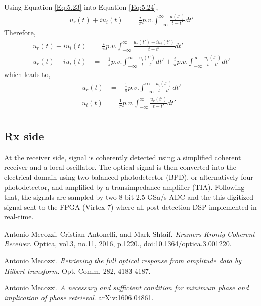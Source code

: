 Using Equation \ref{Eq:5.23} into Equation \ref{Eq:5.24},
\begin{equation}
\begin{split}
u_r(t)+iu_i(t) &=\frac{i}{\pi} p.v. \int_{-\infty}^{\infty} \frac{u(t')}{t-t'} dt' 
\end{split}
\label{Eq:5.24}
\end{equation}
Therefore,
\begin{equation}
\begin{split}
u_r(t)+iu_i(t) &=\frac{i}{\pi} p.v. \int_{-\infty}^{\infty} \frac{u_r(t')+iu_i(t')}{t-t'} dt' \\
u_r(t)+iu_i(t)&=-\frac{1}{\pi} p.v. \int_{-\infty}^{\infty} \frac{u_i(t')}{t-t'} dt' + \frac{i}{\pi} p.v. \int_{-\infty}^{\infty} \frac{u_r(t')}{t-t'} dt'
\end{split}
\label{Eq:5.24}
\end{equation}
which leads to,
\begin{equation}
\begin{split}
u_r(t) &=-\frac{1}{\pi} p.v. \int_{-\infty}^{\infty} \frac{u_i(t')}{t-t'} dt' \\
u_i(t) &=\frac{1}{\pi} p.v. \int_{-\infty}^{\infty} \frac{u_r(t')}{t-t'} dt' \\
\end{split}
\label{Eq:5.24}
\end{equation}





  



\subsection{Rx side}
At the receiver side, signal is coherently detected using a simplified coherent receiver and a local oscillator. The optical signal is then converted into the electrical domain using two balanced photodetector (BPD), or alternatively four photodetector, and amplified by a transimpedance amplifier (TIA). Following that, the signals are sampled by two 8-bit 2.5 GSa/s ADC and the this digitized signal sent to the FPGA (Virtex-7) where all post-detection DSP implemented in real-time.

\begin{thebibliography}{9}
	Antonio Mecozzi, Cristian Antonelli, and Mark Shtaif.
	\textit{Kramers-Kronig Coherent Receiver}.
	Optica, vol.3, no.11, 2016, p.1220., doi:10.1364/optica.3.001220.
	
	Antonio Mecozzi.
	\textit{Retrieving the full optical response from amplitude data by Hilbert transform}. Opt. Comm. 282, 4183-4187.
	
	Antonio Mecozzi.
	\textit{A necessary and sufficient condition for minimum phase and implication of phase retrieval}. arXiv:1606.04861.
\end{thebibliography}


